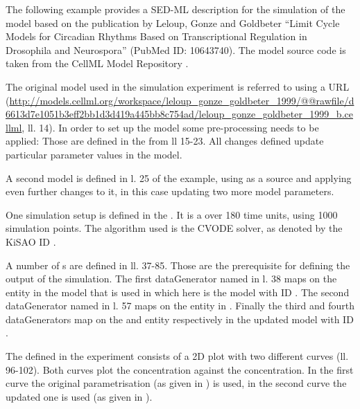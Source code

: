 The following example provides a SED-ML description for the simulation of the model based on the publication by Leloup, Gonze and Goldbeter ``Limit Cycle Models for Circadian Rhythms Based on Transcriptional Regulation in Drosophila and Neurospora'' (PubMed ID: 10643740).
The model source code is taken from the CellML Model Repository \citep{LLH+08}. 

The original model used in the simulation experiment is referred to using a URL (\url{http://models.cellml.org/workspace/leloup_gonze_goldbeter_1999/@@rawfile/d6613d7e1051b3eff2bb1d3d419a445bb8c754ad/leloup_gonze_goldbeter_1999_b.cellml}, ll. 14).
In order to set up the model some pre-processing needs to be applied: Those are defined in the  from ll 15-23. All changes defined update particular parameter values in the model.

A second model is defined in l. 25 of the example, using  as a source and applying even further changes to it, in this case updating two more model parameters.

One simulation setup is defined in the . It is a  over 180 time units, using 1000 simulation points. The algorithm used is the CVODE solver, as denoted by the KiSAO ID .

A number of s are defined in ll. 37-85. Those are the prerequisite for defining the output of the simulation. The first dataGenerator named  in l. 38 maps on the  entity in the model that is used in  which here is the model with ID . The second dataGenerator named  in l. 57 maps on the  entity in . Finally  the third and fourth dataGenerators map on the  and  entity respectively in the updated model with ID .

The  defined in the experiment consists of a 2D plot with two different curves (ll. 96-102). Both curves plot the  concentration against the  concentration. In the first curve the original parametrisation (as given in ) is used, in the second curve the updated one is used (as given in ).


